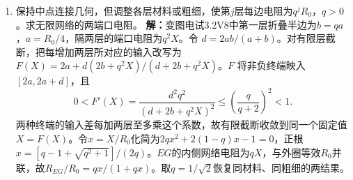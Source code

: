 \documentclass[UTF8,fontset=fandol,a4paper,11pt]{ctexart}
\begin{document}
\begin{enumerate}
\item 保持中点连接几何，但调整各层材料或粗细，使第$j$层每边电阻为$q^jR_0$，$q>0$。求无限网络的两端口电阻。
\textbf{解：}变图电试3.2V8中第一层折叠半边为$b=qa$，$a=R_0/4$，隔两层的端口电阻为$q^2X$。令 $d=2ab/(a+b)$。对有限层截断，把每增加两层所对应的输入改写为 $F(X)=2a+d(2b+q^2X)/(d+2b+q^2X)$。$F$ 将非负终端映入 $[2a,2a+d]$，且
\[
0<F'(X)=\frac{d^2q^2}{(d+2b+q^2X)^2}
\le\left(\frac{q}{q+2}\right)^2<1.
\]
两种终端的输入差每加两层至多乘这个系数，故有限截断收敛到同一个固定值 $X=F(X)$。令$x=X/R_0$化简为$2qx^2+2(1-q)x-1=0$，正根$x=[q-1+\sqrt{q^2+1}]/(2q)$。$EG$的内侧网络电阻为$qX$，与外圈等效$R_0$并联，故$R_{EG}/R_0=qx/(1+qx)$。取$q=1/\sqrt2$恢复同材料、同粗细的两结果。
\begin{center}\begin{minipage}{.98\linewidth}\centering
{}
\end{minipage}
\end{center}
\end{enumerate}
\end{document}
